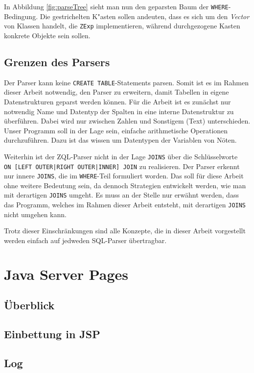 In Abbildung \ref{fig:parseTree} sieht man nun den geparsten Baum der \verb|WHERE|-Bedingung. Die gestrichelten K"asten sollen andeuten, dass es sich um den \textit{Vector} von Klassen handelt, die \verb|ZExp| implementieren, während durchgezogene Kasten konkrete Objekte sein sollen.

\subsection{Grenzen des Parsers}
\label{subsec:grenzenparser}

Der Parser kann keine \verb|CREATE TABLE|-Statements parsen. Somit ist es im Rahmen dieser Arbeit notwendig, den Parser zu erweitern, damit Tabellen in eigene Datenstrukturen geparst werden können. Für die Arbeit ist es zunächst nur notwendig Name und Datentyp der Spalten in eine interne Datenstruktur zu überführen. Dabei wird nur zwischen Zahlen und Sonstigem (Text) unterschieden. Unser Programm soll in der Lage sein, einfache arithmetische Operationen durchzuführen. Dazu ist das wissen um Datentypen der Variablen von Nöten.

Weiterhin ist der ZQL-Parser nicht in der Lage \verb|JOINS| über die Schlüsselworte \\\verb#ON [LEFT OUTER|RIGHT OUTER|INNER] JOIN# zu realisieren. Der Parser erkennt nur innere \verb|JOINS|, die im \verb|WHERE|-Teil formuliert worden. Das soll für diese Arbeit ohne weitere Bedeutung sein, da dennoch Strategien entwickelt werden, wie man mit derartigen \verb|JOINS| umgeht. Es muss an der Stelle nur erwähnt werden, dass das Programm, welches im Rahmen dieser Arbeit entsteht, mit derartigen \verb|JOINS| nicht umgehen kann.

Trotz dieser Einschränkungen sind alle Konzepte, die in dieser Arbeit vorgestellt werden einfach auf jedweden SQL-Parser übertragbar.


\section{Java Server Pages}

\subsection{Überblick}

\subsection{Einbettung in JSP}

\subsection{Log}